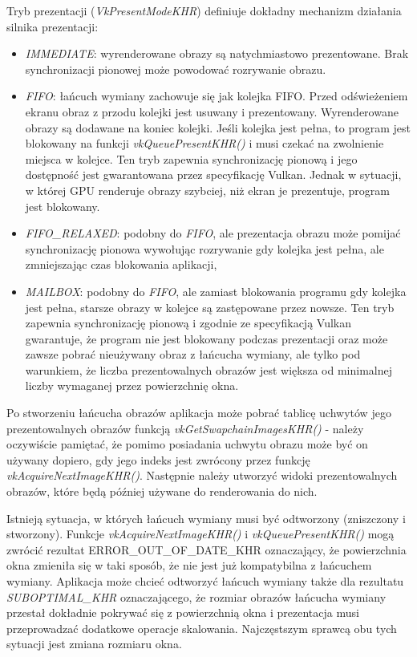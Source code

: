 Tryb prezentacji (\textit{VkPresentModeKHR}) definiuje dokładny mechanizm działania silnika prezentacji:
\begin{itemize}
	\item \textit{IMMEDIATE}: wyrenderowane obrazy są natychmiastowo prezentowane. Brak synchronizacji pionowej może powodować rozrywanie obrazu.
	\item \textit{FIFO}: łańcuch wymiany zachowuje się jak kolejka FIFO. Przed odświeżeniem ekranu obraz z przodu kolejki jest usuwany i prezentowany. Wyrenderowane obrazy są dodawane na koniec kolejki. Jeśli kolejka jest pełna, to program jest blokowany na funkcji \textit{vkQueuePresentKHR()} i musi czekać na zwolnienie miejsca w kolejce. Ten tryb zapewnia synchronizację pionową i jego dostępność jest gwarantowana przez specyfikację Vulkan. Jednak w sytuacji, w której GPU renderuje obrazy szybciej, niż ekran je prezentuje, program jest blokowany.
	\item \textit{FIFO\_RELAXED}: podobny do \textit{FIFO}, ale prezentacja obrazu może pomijać synchronizację pionowa wywołując rozrywanie gdy kolejka jest pełna, ale zmniejszając czas blokowania aplikacji,
	\item \textit{MAILBOX}: podobny do \textit{FIFO}, ale zamiast blokowania programu gdy kolejka jest pełna, starsze obrazy w kolejce są zastępowane przez nowsze. Ten tryb zapewnia synchronizację pionową i zgodnie ze specyfikacją Vulkan gwarantuje, że program nie jest blokowany podczas prezentacji oraz może zawsze pobrać nieużywany obraz z łańcucha wymiany, ale tylko pod warunkiem, że liczba prezentowalnych obrazów jest większa od minimalnej liczby wymaganej przez powierzchnię okna.
\end{itemize}

Po stworzeniu łańcucha obrazów aplikacja może pobrać tablicę uchwytów jego prezentowalnych obrazów funkcją \textit{vkGetSwapchainImagesKHR()} - należy oczywiście pamiętać, że pomimo posiadania uchwytu obrazu może być on używany dopiero, gdy jego indeks jest zwrócony przez funkcję \textit{vkAcquireNextImageKHR()}.
Następnie należy utworzyć widoki prezentowalnych obrazów, które będą później używane do renderowania do nich.

Istnieją sytuacja, w których łańcuch wymiany musi być odtworzony (zniszczony i stworzony).
Funkcje \textit{vkAcquireNextImageKHR()} i \textit{vkQueuePresentKHR()} mogą zwrócić rezultat
ERROR\_OUT\_OF\_DATE\_KHR oznaczający, że powierzchnia okna zmieniła się w taki sposób, że nie jest już kompatybilna z łańcuchem wymiany.
Aplikacja może chcieć odtworzyć łańcuch wymiany także dla rezultatu \textit{SUBOPTIMAL\_KHR} oznaczającego, że rozmiar obrazów łańcucha wymiany przestał dokładnie pokrywać się z powierzchnią okna i prezentacja musi przeprowadzać dodatkowe operacje skalowania.
Najczęstszym sprawcą obu tych sytuacji jest zmiana rozmiaru okna.


